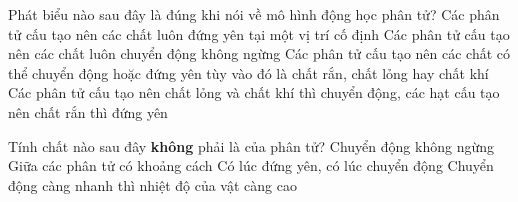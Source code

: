 \begin{ex}
	Phát biểu nào sau đây là đúng khi nói về mô hình động học phân tử?
	\choice
	{Các phân tử cấu tạo nên các chất luôn đứng yên tại một vị trí cố định}
	{\True Các phân tử cấu tạo nên các chất luôn chuyển động không ngừng}
	{Các phân tử cấu tạo nên các chất có thể chuyển động hoặc đứng yên tùy vào đó là chất rắn, chất lỏng hay chất khí}
	{Các phân tử cấu tạo nên chất lỏng và chất khí thì chuyển động, các hạt cấu tạo nên chất rắn thì đứng yên}
\end{ex}

\begin{ex}
	Tính chất nào sau đây \textbf{không} phải là của phân tử?
	\choice
	{Chuyển động không ngừng}
	{Giữa các phân tử có khoảng cách}
	{\True Có lúc đứng yên, có lúc chuyển động}
	{Chuyển động càng nhanh thì nhiệt độ của vật càng cao}
\end{ex}


